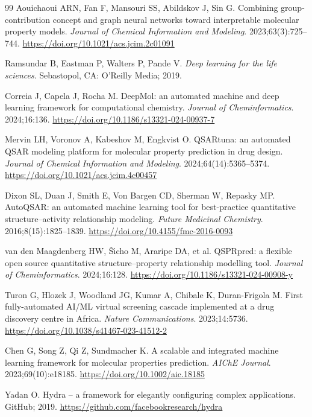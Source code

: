 \begin{thebibliography}{99}
Aouichaoui ARN, Fan F, Mansouri SS, Abildskov J, Sin G. Combining group-contribution concept and graph neural networks toward interpretable molecular property models. \emph{Journal of Chemical Information and Modeling}. 2023;63(3):725--744. \url{https://doi.org/10.1021/acs.jcim.2c01091}

Ramsundar B, Eastman P, Walters P, Pande V. \emph{Deep learning for the life sciences}. Sebastopol, CA: O'Reilly Media; 2019.

Correia J, Capela J, Rocha M. DeepMol: an automated machine and deep learning framework for computational chemistry. \emph{Journal of Cheminformatics}. 2024;16:136. \url{https://doi.org/10.1186/s13321-024-00937-7}

Mervin LH, Voronov A, Kabeshov M, Engkvist O. QSARtuna: an automated QSAR modeling platform for molecular property prediction in drug design. \emph{Journal of Chemical Information and Modeling}. 2024;64(14):5365--5374. \url{https://doi.org/10.1021/acs.jcim.4c00457}

Dixon SL, Duan J, Smith E, Von Bargen CD, Sherman W, Repasky MP. AutoQSAR: an automated machine learning tool for best-practice quantitative structure--activity relationship modeling. \emph{Future Medicinal Chemistry}. 2016;8(15):1825--1839. \url{https://doi.org/10.4155/fmc-2016-0093}

van den Maagdenberg HW, \v{S}\'\i cho M, Araripe DA, et al. QSPRpred: a flexible open source quantitative structure--property relationship modelling tool. \emph{Journal of Cheminformatics}. 2024;16:128. \url{https://doi.org/10.1186/s13321-024-00908-y}

Turon G, Hlozek J, Woodland JG, Kumar A, Chibale K, Duran-Frigola M. First fully-automated AI/ML virtual screening cascade implemented at a drug discovery centre in Africa. \emph{Nature Communications}. 2023;14:5736. \url{https://doi.org/10.1038/s41467-023-41512-2}

Chen G, Song Z, Qi Z, Sundmacher K. A scalable and integrated machine learning framework for molecular properties prediction. \emph{AIChE Journal}. 2023;69(10):e18185. \url{https://doi.org/10.1002/aic.18185}

Yadan O. Hydra -- a framework for elegantly configuring complex applications. GitHub; 2019. \url{https://github.com/facebookresearch/hydra}


\end{thebibliography}
